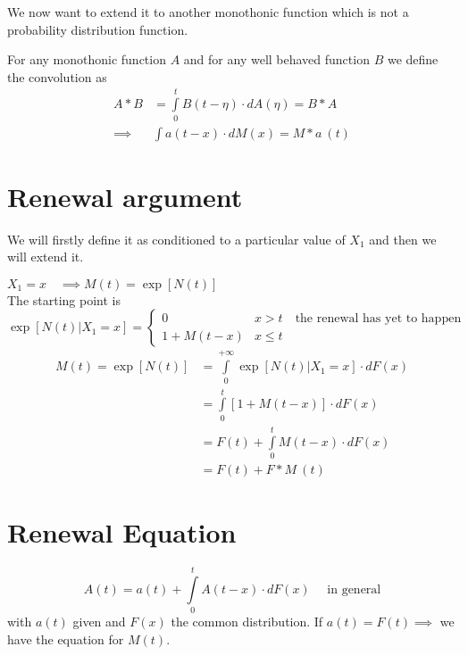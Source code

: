We now want to extend it to another monothonic function which is not a probability distribution function.

\begin{definition}[Convolution]
	For any monothonic function $A$ and for any well behaved function $B$ we define the convolution as
	\begin{equation}\begin{split}
		A \ast B &= \int\limits_0^t B(t-\eta)\cdot dA(\eta) = B \ast A \\
		\implies &\int a(t-x)\cdot dM(x) = M \ast a ~(t)
	\end{split}\end{equation}
\end{definition}

\section{Renewal argument}
We will firstly define it as conditioned to a particular value of $X_1$ and then we will extend it.

$X_1 = x \quad \implies M(t)= \exp[N(t)]$ \\
The starting point is
\begin{equation}
	\exp[N(t)| X_1=x] =
	\begin{cases}
	0 & x>t \quad \text{the renewal has yet to happen} \\
	1+M(t-x) & x \le t
	\end{cases}
\end{equation}
\begin{equation}
	\begin{split}
	M(t)= \exp[N(t)]&=\int\limits_0^{+\infty}\exp[N(t)|X_1=x] \cdot dF(x)\\
	&=\int\limits_0^{t}[1+M(t-x)] \cdot dF(x)\\
	&= F(t) + \int\limits_0^{t}M(t-x) \cdot dF(x)\\
	&= F(t) + F \ast M ~ (t)
	\end{split}
\end{equation}

\section{Renewal Equation}
\begin{equation}
		A(t) = a(t) +\int\limits_0^{t}A(t-x) \cdot dF(x) \quad \text{ in general}
\end{equation}
with $a(t)$ given and $F(x)$ the common distribution. If $a(t)=F(t) \implies$ we have the equation for $M(t)$.

